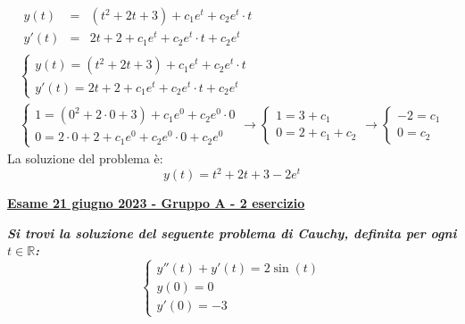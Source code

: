 \documentclass[a4paper]{article}
\newcommand{\definition}[1]{\textcolor{Red3}{\textbf{#1}}}
\newcommand{\example}[1]{\textcolor{Green4}{\textbf{#1}}}
\begin{document}
	\begin{gather*}
		\begin{array}{rcl}
			y\left(t\right) &=& \left(t^{2} + 2t + 3\right) + c_{1}e^{t} + c_{2}e^{t} \cdot t \\ [.5em]
			y'\left(t\right) &=& 2t + 2 + c_{1}e^{t} + c_{2}e^{t} \cdot t + c_{2}e^{t}
		\end{array} \\ 
		\begin{cases}
			y\left(t\right) = \left(t^{2} + 2t + 3\right) + c_{1}e^{t} + c_{2}e^{t} \cdot t \\
			y'\left(t\right) = 2t + 2 + c_{1}e^{t} + c_{2}e^{t} \cdot t + c_{2}e^{t}
		\end{cases} \\
		\begin{cases}
			1 = \left(0^{2} + 2 \cdot 0 + 3\right) + c_{1}e^{0} + c_{2}e^{0} \cdot 0 \\
			0 = 2 \cdot 0 + 2 + c_{1}e^{0} + c_{2}e^{0} \cdot 0 + c_{2}e^{0}
		\end{cases}
		\rightarrow
		\begin{cases}
			1 = 3 + c_{1} \\
			0 = 2 + c_{1} + c_{2}
		\end{cases}
		\rightarrow
		\begin{cases}
			-2 = c_{1} \\
			0 = c_{2}
		\end{cases}
	\end{gather*}
	La soluzione del problema è:
	\begin{equation*}
		y\left(t\right) = t^{2} + 2t + 3 - 2e^{t}
	\end{equation*}\newpage

	\begin{flushleft}
		\label{exam: esame 21 giugno 2023 - Gruppo A - 2 esercizio}
		\hypertarget{
			exam: esame 21 giugno 2023 - Gruppo A - 2 esercizio
		}{
			\definition{\underline{Esame 21 giugno 2023 - Gruppo A - 2 esercizio}}
		}
	\end{flushleft}
	\example{\emph{Si trovi la soluzione del seguente problema di Cauchy, definita per ogni $t \in \mathbb{R}$:}
	\begin{equation*}
		\begin{cases}
			y''\left(t\right) + y'\left(t\right) = 2\sin\left(t\right) \\
			y\left(0\right) = 0 \\
			y'\left(0\right) = -3
		\end{cases}
	\end{equation*}}
\end{document}
